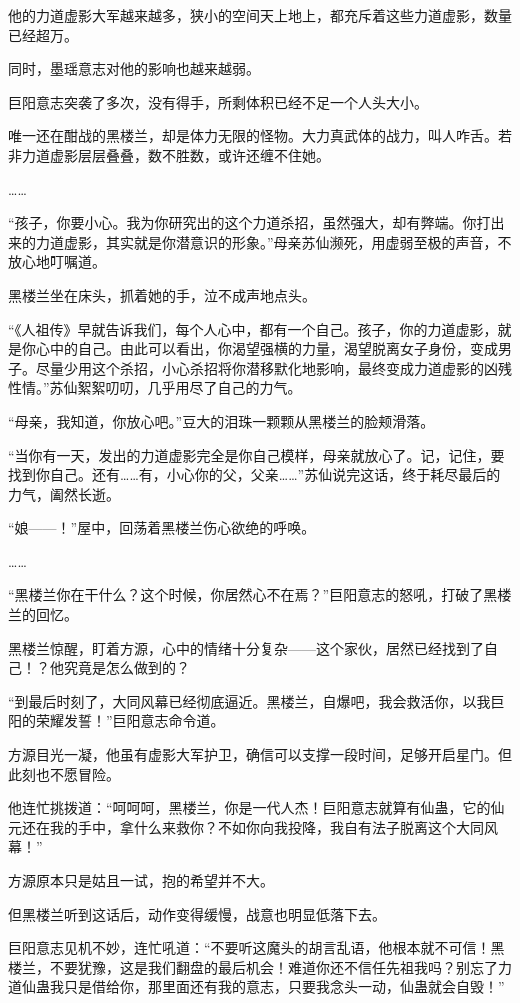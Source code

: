 \begin{this_body}
他的力道虚影大军越来越多，狭小的空间天上地上，都充斥着这些力道虚影，数量已经超万。

同时，墨瑶意志对他的影响也越来越弱。

巨阳意志突袭了多次，没有得手，所剩体积已经不足一个人头大小。

唯一还在酣战的黑楼兰，却是体力无限的怪物。大力真武体的战力，叫人咋舌。若非力道虚影层层叠叠，数不胜数，或许还缠不住她。

……

“孩子，你要小心。我为你研究出的这个力道杀招，虽然强大，却有弊端。你打出来的力道虚影，其实就是你潜意识的形象。”母亲苏仙濒死，用虚弱至极的声音，不放心地叮嘱道。

黑楼兰坐在床头，抓着她的手，泣不成声地点头。

“《人祖传》早就告诉我们，每个人心中，都有一个自己。孩子，你的力道虚影，就是你心中的自己。由此可以看出，你渴望强横的力量，渴望脱离女子身份，变成男子。尽量少用这个杀招，小心杀招将你潜移默化地影响，最终变成力道虚影的凶残性情。”苏仙絮絮叨叨，几乎用尽了自己的力气。

“母亲，我知道，你放心吧。”豆大的泪珠一颗颗从黑楼兰的脸颊滑落。

“当你有一天，发出的力道虚影完全是你自己模样，母亲就放心了。记，记住，要找到你自己。还有……有，小心你的父，父亲……”苏仙说完这话，终于耗尽最后的力气，阖然长逝。

“娘——！”屋中，回荡着黑楼兰伤心欲绝的呼唤。

……

“黑楼兰你在干什么？这个时候，你居然心不在焉？”巨阳意志的怒吼，打破了黑楼兰的回忆。

黑楼兰惊醒，盯着方源，心中的情绪十分复杂——这个家伙，居然已经找到了自己！？他究竟是怎么做到的？

“到最后时刻了，大同风幕已经彻底逼近。黑楼兰，自爆吧，我会救活你，以我巨阳的荣耀发誓！”巨阳意志命令道。

方源目光一凝，他虽有虚影大军护卫，确信可以支撑一段时间，足够开启星门。但此刻也不愿冒险。

他连忙挑拨道：“呵呵呵，黑楼兰，你是一代人杰！巨阳意志就算有仙蛊，它的仙元还在我的手中，拿什么来救你？不如你向我投降，我自有法子脱离这个大同风幕！”

方源原本只是姑且一试，抱的希望并不大。

但黑楼兰听到这话后，动作变得缓慢，战意也明显低落下去。

巨阳意志见机不妙，连忙吼道：“不要听这魔头的胡言乱语，他根本就不可信！黑楼兰，不要犹豫，这是我们翻盘的最后机会！难道你还不信任先祖我吗？别忘了力道仙蛊我只是借给你，那里面还有我的意志，只要我念头一动，仙蛊就会自毁！”


\end{this_body}
